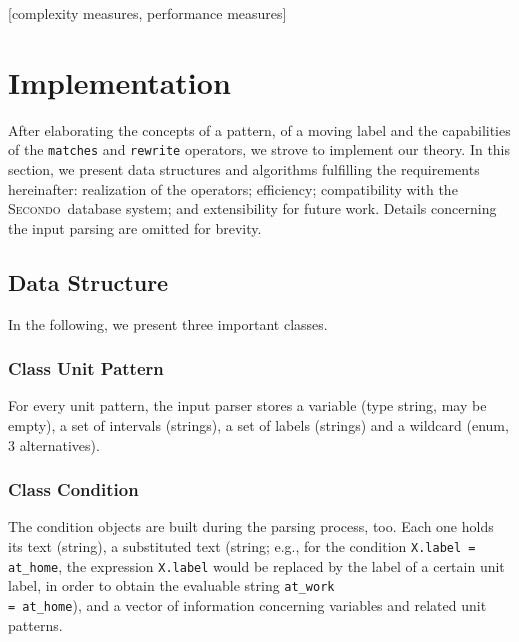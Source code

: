 \documentclass{sig-alternate}
\newcommand{\secondo}{\textsc{Secondo}}
\begin{document}
[complexity measures, performance measures]



\section{Implementation}
After elaborating the concepts of a pattern, of a moving label and the capabilities of the \texttt{matches} and \texttt{rewrite} operators, we strove to implement our theory. In this section, we present data structures and algorithms fulfilling the requirements hereinafter: realization of the operators; efficiency; compatibility with the \secondo\ database system; and extensibility for future work. Details concerning the input parsing are omitted for brevity.

\subsection{Data Structure}
In the following, we present three important classes. 

\subsubsection{Class Unit Pattern}
For every unit pattern, the input parser stores a variable (type string, may be empty), a set of intervals (strings), a set of labels (strings) and a wildcard (enum, 3 alternatives).

\subsubsection{Class Condition}\label{sec:class condition}
The condition objects are built during the parsing process, too. Each one holds its text (string), a substituted text (string; e.g., for the condition \texttt{X.label = \dq at\_home\dq}, the expression \texttt{X.label} would be replaced by the label of a certain unit label, in order to obtain the evaluable string \texttt{\dq at\_work\dq \\= \dq at\_home\dq}), and a vector of information concerning variables and related unit patterns.
\end{document}
